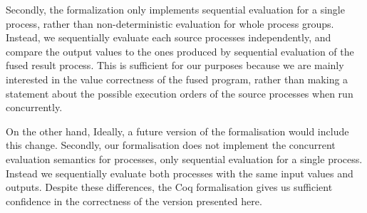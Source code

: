 Secondly, the formalization only implements sequential evaluation for a single process, rather than non-deterministic evaluation for whole process groups. Instead, we sequentially evaluate each source processes independently, and compare the output values to the ones produced by sequential evaluation of the fused result process. This is sufficient for our purposes because we are mainly interested in the value correctness of the fused program, rather than making a statement about the possible execution orders of the source processes when run concurrently.

On the other hand, 
Ideally, a future version of the formalisation would include this change.
Secondly, our formalisation does not implement the concurrent evaluation semantics for processes, only sequential evaluation for a single process. Instead we sequentially evaluate both processes with the same input values and outputs. Despite these differences, the Coq formalisation gives us sufficient confidence in the correctness of the version presented here.

